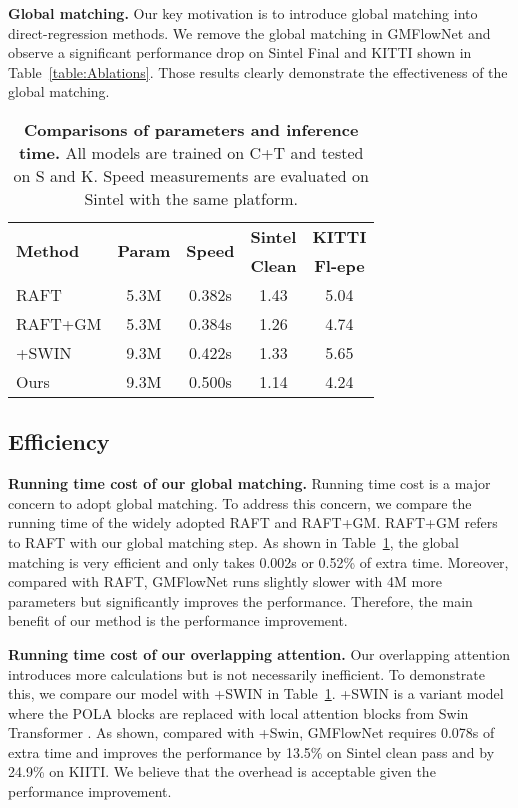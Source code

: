 \documentclass[10pt,twocolumn,letterpaper]{article}
\begin{document}
{\bf Global matching.} Our key motivation is to introduce global matching into direct-regression methods. We remove the global matching in GMFlowNet and observe a significant performance drop on Sintel Final and KITTI shown in Table~\ref{table:Ablations}. 
Those results clearly demonstrate the effectiveness of the global matching.


\begin{table}
  \centering
  \begin{tabular}{l*{4}{c}}
    \toprule
    \multirow{2}{*}{{\bf Method}} & \multirow{2}{*}{{\bf Param}} & \multirow{2}{*}{{\bf Speed}} & {\bf Sintel} & {\bf KITTI}
    \\
    & & & {\bf Clean} & {\bf Fl-epe}  \\
    \midrule
RAFT\cite{teed2020raft} & 5.3M & 0.382s & 1.43 & 5.04\\
    RAFT+GM & 5.3M & 0.384s & 1.26 & 4.74 \\
    \midrule
    +SWIN\cite{liu2021swin} & 9.3M & 0.422s & 1.33 & 5.65 \\
    Ours & 9.3M & 0.500s & 1.14 & 4.24\\
    \bottomrule
  \end{tabular}
  \caption{{\bf Comparisons of parameters and inference time.} All models are trained on C+T and tested on S and K. Speed measurements are evaluated on Sintel with the same platform.}
  \label{tab:param_time}
\end{table}

\subsection{Efficiency}

{\bf Running time cost of our global matching.} Running time cost is a major concern to adopt global matching. To address this concern, we compare the running time of the widely adopted RAFT and RAFT+GM. RAFT+GM refers to RAFT with our global matching step. As shown in Table~\ref{tab:param_time}, the global matching is very efficient and only takes 0.002s or 0.52\% of extra time. 
Moreover, compared with RAFT, GMFlowNet runs slightly slower with 4M more parameters but significantly improves the performance. Therefore, the main benefit of our method is the performance improvement.


{\bf Running time cost of our overlapping attention.} Our overlapping attention introduces more calculations but is not necessarily inefficient. To demonstrate this, we compare our model with +SWIN in Table~\ref{tab:param_time}. +SWIN is a variant model where the POLA blocks are replaced with local attention blocks from Swin Transformer \cite{liu2021swin}. As shown, compared with +Swin, GMFlowNet requires 0.078s of extra time and improves the performance by 13.5\% on Sintel clean pass and by 24.9\% on KIITI. 
We believe that the overhead is acceptable given the performance improvement. 
\end{document}
